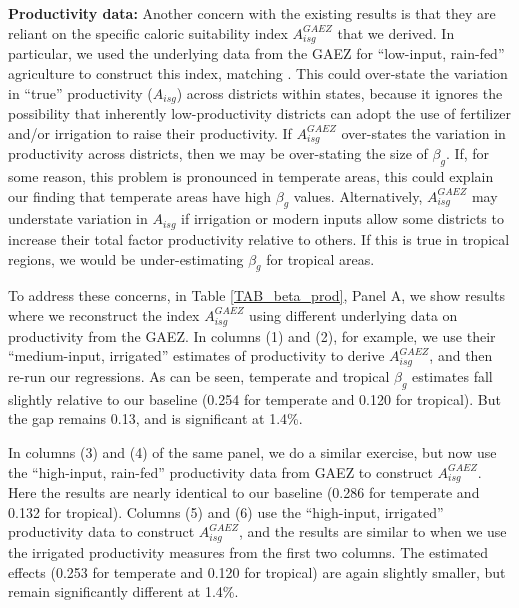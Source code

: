 \documentclass[12pt]{article}
\begin{document}
\vspace{.5cm}\noindent\textbf{Productivity data:} Another concern with the existing results is that they are reliant on the specific caloric suitability index $A_{isg}^{GAEZ}$ that we derived. In particular, we used the underlying data from the GAEZ for ``low-input, rain-fed'' agriculture to construct this index, matching \cite{galorozak2016}. This could over-state the variation in ``true'' productivity ($A_{isg}$) across districts within states, because it ignores the possibility that inherently low-productivity districts can adopt the use of fertilizer and/or irrigation to raise their productivity. If $A_{isg}^{GAEZ}$ over-states the variation in productivity across districts, then we may be over-stating the size of $\beta_g$. If, for some reason, this problem is pronounced in temperate areas, this could explain our finding that temperate areas have high $\beta_g$ values. Alternatively, $A_{isg}^{GAEZ}$ may understate variation in $A_{isg}$ if irrigation or modern inputs allow some districts to increase their total factor productivity relative to others. If this is true in tropical regions, we would be under-estimating $\beta_g$ for tropical areas.

To address these concerns, in Table \ref{TAB_beta_prod}, Panel A, we show results where we reconstruct the index $A_{isg}^{GAEZ}$ using different underlying data on productivity from the GAEZ. In columns (1) and (2), for example, we use their ``medium-input, irrigated'' estimates of productivity to derive $A_{isg}^{GAEZ}$, and then re-run our regressions. As can be seen, temperate and tropical $\beta_g$ estimates fall slightly relative to our baseline (0.254 for temperate and 0.120 for tropical). But the gap remains 0.13, and is significant at 1.4\%.

In columns (3) and (4) of the same panel, we do a similar exercise, but now use the ``high-input, rain-fed'' productivity data from GAEZ to construct $A_{isg}^{GAEZ}$. Here the results are nearly identical to our baseline (0.286 for temperate and 0.132 for tropical). Columns (5) and (6) use the ``high-input, irrigated'' productivity data to construct $A_{isg}^{GAEZ}$, and the results are similar to when we use the irrigated productivity measures from the first two columns. The estimated effects (0.253 for temperate and 0.120 for tropical) are again slightly smaller, but remain significantly different at 1.4\%.
\end{document}
